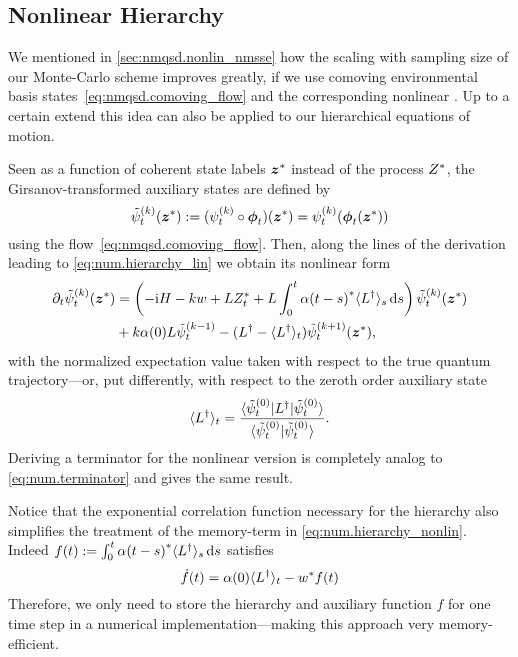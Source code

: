 \subsection{Nonlinear Hierarchy}
\label{sub:num.sheom.nonlin}

We mentioned in \autoref{sec:nmqsd.nonlin_nmsse} how the scaling with sampling size of our Monte-Carlo scheme improves greatly, if we use comoving environmental basis states~\ref{eq:nmqsd.comoving_flow} and the corresponding nonlinear \NMSSE\@.
Up to a certain extend this idea can also be applied to our hierarchical equations of motion.

Seen as a function of coherent state labels ${\boldsymbol{z}}^*$ instead of the process ${Z}^*$, the Girsanov-transformed auxiliary states are defined by
\begin{equation*}
  \tilde\psi_t^{(k)}(\cc\zz) := (\psit[k] \circ \vec\phi_t)(\cc\zz) = \psit[k](\vec\phi_t(\cc\zz))
\end{equation*}
using the  flow~\ref{eq:nmqsd.comoving_flow}.
Then, along the lines of the derivation leading to \autoref{eq:num.hierarchy_lin} we obtain its nonlinear form
\begin{align}
  \partial_t \tilde\psi_t^{(k)}({\boldsymbol{z}}^*) &= \left( -\mathrm{i}H - kw + L{Z}^*_t + L \int_0^t {\alpha(t-s)}^* \langle L^\dagger \rangle_s \, \mathrm{d} s \right)\tilde\psi_t^{(k)}({\boldsymbol{z}}^*) \nonumber\\
  &+ k \alpha(0) L \tilde\psi_t^{(k-1)} - (L^\dagger - \langle L^\dagger \rangle_t) \tilde\psi_t^{(k+1)}({\boldsymbol{z}}^*),
  \label{eq:num.hierarchy_nonlin}
\end{align}
with the normalized expectation value taken with respect to the true quantum trajectory---or, put differently, with respect to the zeroth order auxiliary state
\begin{equation}
  \langle L^\dagger \rangle_t = \frac{\langle \tilde\psi_t^{(0)} | L^\dagger | \tilde\psi_t^{(0)} \rangle}{\langle \tilde\psi_t^{(0)} | \tilde\psi_t^{(0)} \rangle}.
  \label{eq:num.qmean}
\end{equation}
Deriving a terminator for the nonlinear version is completely analog to \autoref{eq:num.terminator} and gives the same result.

Notice that the exponential correlation function necessary for the hierarchy also simplifies the treatment of the memory-term in \autoref{eq:num.hierarchy_nonlin}.
Indeed $f(t) := \int_0^t {\alpha(t-s)}^* \langle L^\dagger \rangle_s \, \mathrm{d} s$ satisfies
\begin{equation}
  \dot f(t) = \alpha(0) \langle L^\dagger \rangle_t - {w}^* f(t)
  \label{eq:num.memory_term}
\end{equation}
Therefore, we only need to store the hierarchy and auxiliary function $f$ for one time step in a numerical implementation---making this approach very memory-efficient.

